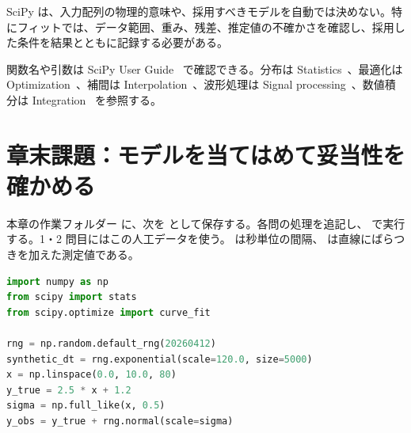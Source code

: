 SciPy は、入力配列の物理的意味や、採用すべきモデルを自動では決めない。特にフィットでは、データ範囲、重み、残差、推定値の不確かさを確認し、採用した条件を結果とともに記録する必要がある。

関数名や引数は SciPy User Guide~\cite{scipy_user_guide} で確認できる。分布は Statistics~\cite{scipy_stats}、最適化は Optimization~\cite{scipy_optimize}、補間は Interpolation~\cite{scipy_interpolate}、波形処理は Signal processing~\cite{scipy_signal}、数値積分は Integration~\cite{scipy_integrate} を参照する。

\section{章末課題：モデルを当てはめて妥当性を確かめる}

本章の作業フォルダー  に、次を  として保存する。各問の処理を追記し、 で実行する。1・2 問目にはこの人工データを使う。 は秒単位の間隔、 は直線にばらつきを加えた測定値である。

\begin{lstlisting}[language=Python]
import numpy as np
from scipy import stats
from scipy.optimize import curve_fit

rng = np.random.default_rng(20260412)
synthetic_dt = rng.exponential(scale=120.0, size=5000)
x = np.linspace(0.0, 10.0, 80)
y_true = 2.5 * x + 1.2
sigma = np.full_like(x, 0.5)
y_obs = y_true + rng.normal(scale=sigma)
\end{lstlisting}

